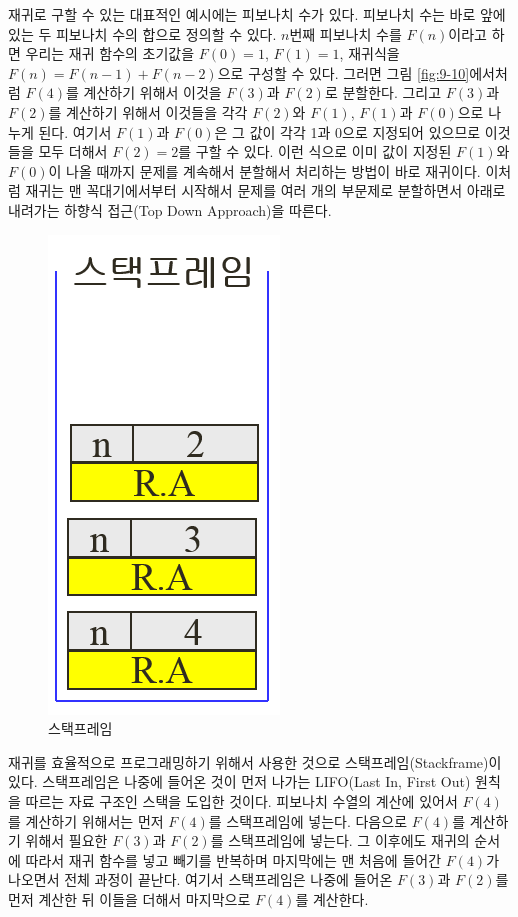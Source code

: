 \documentclass[a4paper]{oblivoir}
\begin{document}
재귀로 구할 수 있는 대표적인 예시에는 피보나치 수가 있다. 피보나치 수는 바로 앞에 있는 두 피보나치 수의 합으로 정의할 수 있다. $n$번째 피보나치 수를 $F(n)$이라고 하면 우리는 재귀 함수의 초기값을 $F(0)=1$, $F(1)=1$, 재귀식을 $F(n) = F(n-1) + F(n-2)$으로 구성할 수 있다.  그러면 그림 \ref{fig:9-10}에서처럼 $F(4)$를 계산하기 위해서 이것을 $F(3)$과 $F(2)$로 분할한다. 그리고 $F(3)$과 $F(2)$를 계산하기 위해서 이것들을 각각 $F(2)$와 $F(1)$, $F(1)$과 $F(0)$으로 나누게 된다. 여기서 $F(1)$과 $F(0)$은 그 값이 각각 1과 0으로 지정되어 있으므로 이것들을 모두 더해서 $F(2)=2$를 구할 수 있다. 이런 식으로 이미 값이 지정된 $F(1)$와 $F(0)$이 나올 때까지 문제를 계속해서 분할해서 처리하는 방법이 바로 재귀이다. 이처럼 재귀는 맨 꼭대기에서부터 시작해서 문제를 여러 개의 부문제로 분할하면서 아래로 내려가는 하향식 접근(Top Down Approach)을 따른다.\\

\begin{figure}[ht] \centering 
\includegraphics[scale=0.6]{fig9_11.png} 
\caption{스택프레임}
\label{fig:9-11}
\end{figure}

재귀를 효율적으로 프로그래밍하기 위해서 사용한 것으로 스택프레임(Stackframe)이 있다. 스택프레임은 나중에 들어온 것이 먼저 나가는 LIFO(Last In, First Out) 원칙을 따르는 자료 구조인 스택을 도입한 것이다. 피보나치 수열의 계산에 있어서 $F(4)$를 계산하기 위해서는 먼저 $F(4)$를 스택프레임에 넣는다. 다음으로 $F(4)$를 계산하기 위해서 필요한 $F(3)$과 $F(2)$를 스택프레임에 넣는다. 그 이후에도 재귀의 순서에 따라서 재귀 함수를 넣고 빼기를 반복하며 마지막에는 맨 처음에 들어간 $F(4)$가 나오면서 전체 과정이 끝난다. 여기서 스택프레임은 나중에 들어온 $F(3)$과 $F(2)$를 먼저 계산한 뒤 이들을 더해서 마지막으로 $F(4)$를 계산한다. \\
\end{document}
